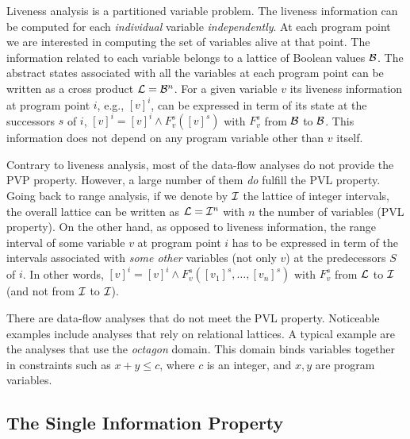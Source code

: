 Liveness analysis is a partitioned variable problem. 
The liveness information can be computed for each \emph{individual} variable \emph{independently}. 
At each program point we are interested in computing the set of variables alive at that point.
The information related to each variable belongs to a lattice of Boolean values ${\cal B}$.
The abstract states associated with all the variables at each program point can be written as a cross product ${\cal L}={\cal B}^n$.
For a given variable $v$ its liveness information at program point $i$, e.g., $[v]^i$, can be expressed in term of its state at the successors $s$ of $i$,
$[v]^i = [v]^i \wedge F_v^s([v]^s)$ with $F_v^s$ from $\cal B$ to $\cal B$.
This information does not depend on any program variable other than $v$ itself.

Contrary to liveness analysis, most of the data-flow analyses do not provide the PVP property.
However, a large number of them \emph{do} fulfill the PVL property.
Going back to range analysis, if we denote by $\cal I$ the lattice of integer intervals, the overall lattice can be written as ${\cal L}={\cal I}^n$ with $n$ the number of variables (PVL property).
On the other hand, as opposed to liveness information, the range interval of some variable $v$ at program point $i$ has to be expressed in term of the intervals associated with \emph{some other} variables (not only $v$) at the predecessors $S$ of $i$.
In other words,  $[v]^i = [v]^i \wedge  F_v^s([v_1]^s,\dots,[v_n]^s)$ with $F_v^s$ from $\cal L$ to $\cal I$ (and not from $\cal I$ to $\cal I$).

There are data-flow analyses that do not meet the PVL property.
Noticeable examples include analyses that rely on relational lattices.
A typical example are the analyses that use the {\em octagon} domain.
This domain binds variables together in constraints such as $x + y \leq c$, where $c$ is an integer, and $x, y$ are program variables.


\subsection{The Single Information Property}
\label{sec:ssi:pereira:singProp}

